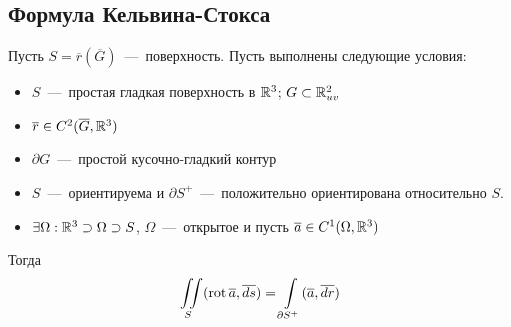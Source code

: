 \subsection{Формула Кельвина-Стокса}
\begin{theorem}
    Пусть $S = \overline{r}(\overline{G})$~---~поверхность. Пусть выполнены следующие условия: 
    \begin{itemize}
        \item $S$~---~простая гладкая поверхность в $\mathbb{R}^3$; $G \subset \mathbb{R}^2_{uv}$
        \item $\overline{r} \in C^2(\overline{G}, \mathbb{R}^3)$
        \item $\partial G$~---~простой кусочно-гладкий контур
        \item $S$~---~ориентируема и $\partial S^+$~---~положительно ориентирована относительно $S$.
        \item $\exists \Omega: \mathbb{R}^3 \supset \Omega \supset S$, $\Omega$~---~открытое и пусть $\overline{a} \in C^1(\Omega, \mathbb{R}^3)$
    \end{itemize}
    Тогда \[\iint\limits_{S} (\operatorname{rot} \overline{a}, \overline{ds}) = \int\limits_{\partial S^+} (\overline{a}, \overline{dr})\]
\end{theorem}
